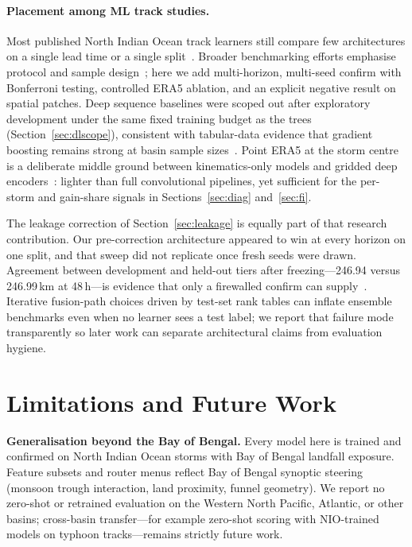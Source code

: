 \documentclass[10pt,twocolumn,a4paper]{article}
\newcommand{\bob}{Bay of Bengal}
\newcommand{\era}{ERA5}
\begin{document}
\paragraph{Placement among ML track studies.}
Most published North Indian Ocean track learners still compare few architectures
on a single lead time or a single split~\cite{kar2021tropical,hossain2021track,kumar2024machine}.
Broader benchmarking efforts emphasise protocol and sample
design~\cite{gomez2026tcbench}; here we add multi-horizon, multi-seed confirm with
Bonferroni testing, controlled \era{} ablation, and an explicit negative result on
spatial patches. Deep sequence baselines were scoped out after exploratory
development under the same fixed training budget as the trees
(Section~\ref{sec:dlscope}), consistent with tabular-data evidence that gradient
boosting remains strong at basin sample sizes~\cite{grinsztajn2022tree}. Point
\era{} at the storm centre is a deliberate middle ground between kinematics-only
models and gridded deep encoders~\cite{giffard2020tropical}: lighter than full
convolutional pipelines, yet sufficient for the per-storm and gain-share signals
in Sections~\ref{sec:diag} and~\ref{sec:fi}.

The leakage correction of Section~\ref{sec:leakage} is equally part of that
research contribution. Our pre-correction architecture appeared to win at every
horizon on one split, and that sweep did not replicate once fresh seeds were
drawn. Agreement between development and held-out tiers after freezing---246.94
versus 246.99\,km at 48\,h---is evidence that only a firewalled confirm can
supply~\cite{cawley2010}. Iterative fusion-path choices driven by test-set rank
tables can inflate ensemble benchmarks even when no learner sees a test label; we
report that failure mode transparently so later work can separate architectural
claims from evaluation hygiene.

\section{Limitations and Future Work}
\label{sec:limits}
\textbf{Generalisation beyond the Bay of Bengal.} Every model here is trained
and confirmed on North Indian Ocean storms with \bob{} landfall exposure. Feature
subsets and router menus reflect \bob{} synoptic steering (monsoon trough
interaction, land proximity, funnel geometry). We report no zero-shot or retrained
evaluation on the Western North Pacific, Atlantic, or other basins; cross-basin
transfer---for example zero-shot scoring with NIO-trained models on typhoon
tracks---remains strictly future work.
\end{document}
